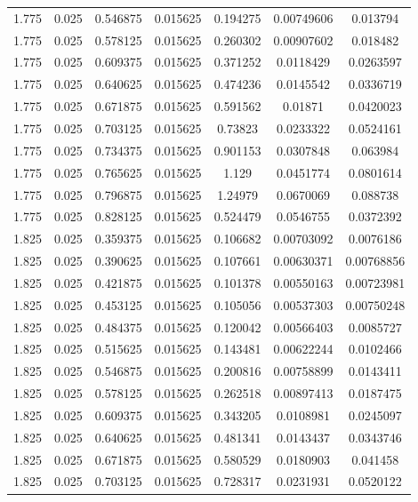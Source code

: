 \begin{table}[bh]
\begin{center}
{\begin{tabular}{ccccccc}
1.775	 & 0.025 & 	0.546875	 & 0.015625	 & 0.194275	 & 0.00749606	 & 0.013794 \\ 
1.775	 & 0.025 & 	0.578125	 & 0.015625	 & 0.260302	 & 0.00907602	 & 0.018482 \\ 
1.775	 & 0.025 & 	0.609375	 & 0.015625	 & 0.371252	 & 0.0118429	 & 0.0263597 \\ 
1.775	 & 0.025 & 	0.640625	 & 0.015625	 & 0.474236	 & 0.0145542	 & 0.0336719 \\ 
1.775	 & 0.025 & 	0.671875	 & 0.015625	 & 0.591562	 & 0.01871	 & 0.0420023 \\ 
1.775	 & 0.025 & 	0.703125	 & 0.015625	 & 0.73823	 & 0.0233322	 & 0.0524161 \\ 
1.775	 & 0.025 & 	0.734375	 & 0.015625	 & 0.901153	 & 0.0307848	 & 0.063984 \\ 
1.775	 & 0.025 & 	0.765625	 & 0.015625	 & 1.129	 & 0.0451774	 & 0.0801614 \\ 
1.775	 & 0.025 & 	0.796875	 & 0.015625	 & 1.24979	 & 0.0670069	 & 0.088738 \\ 
1.775	 & 0.025 & 	0.828125	 & 0.015625	 & 0.524479	 & 0.0546755	 & 0.0372392 \\ 
1.825	 & 0.025 & 	0.359375	 & 0.015625	 & 0.106682	 & 0.00703092	 & 0.0076186 \\ 
1.825	 & 0.025 & 	0.390625	 & 0.015625	 & 0.107661	 & 0.00630371	 & 0.00768856 \\ 
1.825	 & 0.025 & 	0.421875	 & 0.015625	 & 0.101378	 & 0.00550163	 & 0.00723981 \\ 
1.825	 & 0.025 & 	0.453125	 & 0.015625	 & 0.105056	 & 0.00537303	 & 0.00750248 \\ 
1.825	 & 0.025 & 	0.484375	 & 0.015625	 & 0.120042	 & 0.00566403	 & 0.0085727 \\ 
1.825	 & 0.025 & 	0.515625	 & 0.015625	 & 0.143481	 & 0.00622244	 & 0.0102466 \\ 
1.825	 & 0.025 & 	0.546875	 & 0.015625	 & 0.200816	 & 0.00758899	 & 0.0143411 \\ 
1.825	 & 0.025 & 	0.578125	 & 0.015625	 & 0.262518	 & 0.00897413	 & 0.0187475 \\ 
1.825	 & 0.025 & 	0.609375	 & 0.015625	 & 0.343205	 & 0.0108981	 & 0.0245097 \\ 
1.825	 & 0.025 & 	0.640625	 & 0.015625	 & 0.481341	 & 0.0143437	 & 0.0343746 \\ 
1.825	 & 0.025 & 	0.671875	 & 0.015625	 & 0.580529	 & 0.0180903	 & 0.041458 \\ 
1.825	 & 0.025 & 	0.703125	 & 0.015625	 & 0.728317	 & 0.0231931	 & 0.0520122 \\ 

\end{tabular}}
\end{center}
\end{table}
